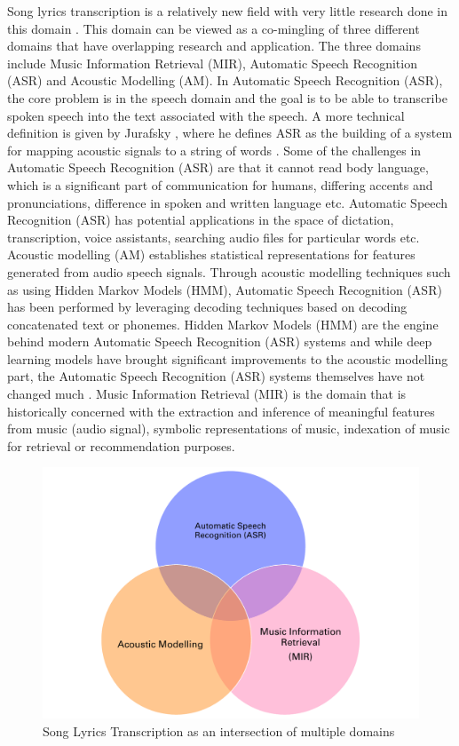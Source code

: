 Song lyrics transcription is a relatively new field with very little research done in this domain \cite{gao2022automatic}. This domain can be viewed as a co-mingling of three different domains that have overlapping research and application. The three domains include Music Information Retrieval (MIR), Automatic Speech Recognition (ASR) and Acoustic Modelling (AM). In Automatic Speech Recognition (ASR), the core problem is in the speech domain and the goal is to be able to transcribe spoken speech into the text associated with the speech. A more technical definition is given by Jurafsky \cite{jurafsky2000speech} , where he defines ASR as the building of a system for mapping acoustic signals to a string of words \cite{jurafsky2000speech} . Some of the challenges in Automatic Speech Recognition (ASR)  \cite{forsberg2003speech} are that it cannot read body language, which is a significant part of communication for humans, differing accents and pronunciations, difference in spoken and written language etc. Automatic Speech Recognition (ASR) has potential applications in the space of dictation, transcription, voice assistants, searching audio files for particular words etc. Acoustic modelling (AM) establishes statistical representations for features generated from audio speech signals\cite{karpagavalli2016review}. Through acoustic modelling techniques such as using Hidden Markov Models (HMM), Automatic Speech Recognition (ASR) has been performed by leveraging decoding techniques based on decoding concatenated text or phonemes. Hidden Markov Models (HMM) are the engine behind modern Automatic Speech Recognition (ASR) systems and while deep learning models have brought significant improvements to the acoustic modelling part, the Automatic Speech Recognition (ASR) systems themselves have not changed much \cite{gales2008application}. Music Information Retrieval (MIR) is the domain that is historically concerned with the extraction and inference of meaningful features from music (audio signal), symbolic representations of music, indexation of music for retrieval or recommendation purposes. 


\begin{figure}[H]
    \centering
    \includegraphics[width=\textwidth]{01-introduction/figures/between_three_domains.pdf}
    \caption{Song Lyrics Transcription as an intersection of multiple domains}%
    \label{fig:setup1}
\end{figure}

